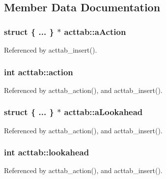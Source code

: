 \subsection{Member Data Documentation}
\hypertarget{structacttab_a0e5f85ec55bf480d43321ce8afffd802}{
\subsubsection[{a\-Action}]{\setlength{\rightskip}{0pt plus 5cm}struct \{ ... \}  $\ast$ acttab\-::a\-Action}}\label{structacttab_a0e5f85ec55bf480d43321ce8afffd802}


Referenced by acttab\-\_\-insert().

\hypertarget{structacttab_a980bd1056514d79ab9f2f28525e62965}{
\subsubsection[{action}]{\setlength{\rightskip}{0pt plus 5cm}int acttab\-::action}}\label{structacttab_a980bd1056514d79ab9f2f28525e62965}


Referenced by acttab\-\_\-action(), and acttab\-\_\-insert().

\hypertarget{structacttab_a70a311363e6cabef637f38b426d3f55c}{
\subsubsection[{a\-Lookahead}]{\setlength{\rightskip}{0pt plus 5cm}struct \{ ... \} 
    $\ast$ acttab\-::a\-Lookahead}}\label{structacttab_a70a311363e6cabef637f38b426d3f55c}


Referenced by acttab\-\_\-action(), and acttab\-\_\-insert().

\hypertarget{structacttab_ad0239fc4ae8bca58ca0ed9cb32871f0f}{
\subsubsection[{lookahead}]{\setlength{\rightskip}{0pt plus 5cm}int acttab\-::lookahead}}\label{structacttab_ad0239fc4ae8bca58ca0ed9cb32871f0f}


Referenced by acttab\-\_\-action(), and acttab\-\_\-insert().

